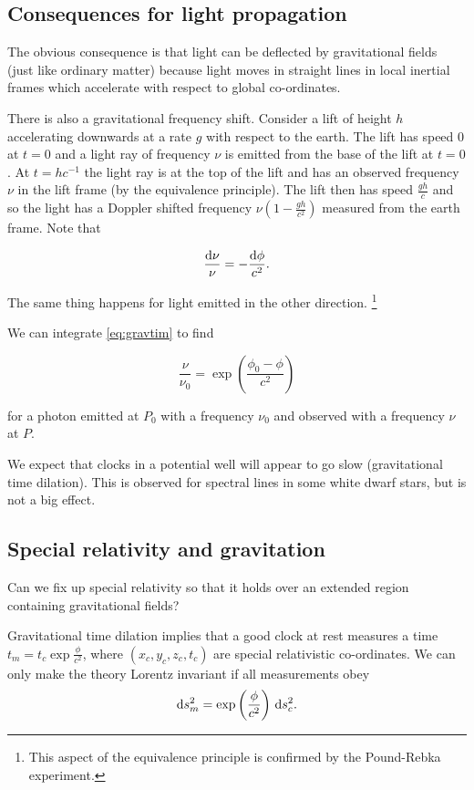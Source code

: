 \documentclass{notes}
\begin{document}
\subsection{Consequences for light propagation}

The obvious consequence is that light can be deflected by gravitational
fields (just like ordinary matter) because light moves in straight lines
in local inertial frames which accelerate with respect to global
co-ordinates.

There is also a gravitational frequency shift.  Consider a lift of height
$h$ accelerating downwards at a rate $g$ with respect to the earth.
The lift has speed $0$ at $t=0$ and a light ray of frequency $\nu$
is emitted from the base of the lift at $t = 0$.  At $t = h c^{-1}$ 
the light ray is at the top of the lift and has an observed frequency
$\nu$ in the lift frame (by the equivalence principle).  The lift
then has speed $\tfrac{gh}{c}$ and so the light has
a Doppler shifted frequency $\nu \left(1 - \frac{gh}{c^2} \right)$
measured from the earth frame.  Note that

\begin{equation}\label{eq:gravtim}
\frac{\mathrm{d} \nu}{\nu} = - \frac{\mathrm{d} \phi}{c^2}.
\end{equation}

The same thing happens for light emitted in the other direction.%
\footnote{This aspect of the equivalence principle is confirmed
by the Pound-Rebka experiment.}

We can integrate \eqref{eq:gravtim} to find

\[
\frac{\nu}{\nu_0} = \exp \left(\frac{\phi_0 - \phi}{c^2}\right)
\]

for a photon emitted at $P_0$ with a frequency $\nu_0$ and observed
with a frequency $\nu$ at $P$.

We expect that clocks in a potential well will appear to go slow
(gravitational time dilation).  This is observed for spectral lines
in some white dwarf stars, but is not a big effect.

\subsection{Special relativity and gravitation}

Can we fix up special relativity so that it holds over an extended
region containing gravitational fields?

Gravitational time dilation implies that a good clock at rest
measures a time $t_m = t_c \exp \frac{\phi}{c^2}$,
where $(x_c, y_c, z_c,t_c)$ are special relativistic co-ordinates.
We can only make the theory Lorentz invariant if all measurements
obey
\[
\mathrm{d} s_m^2 = \exp \left(\frac{\phi}{c^2}\right)\, \mathrm{d} s^2_c.
\]
\end{document}
